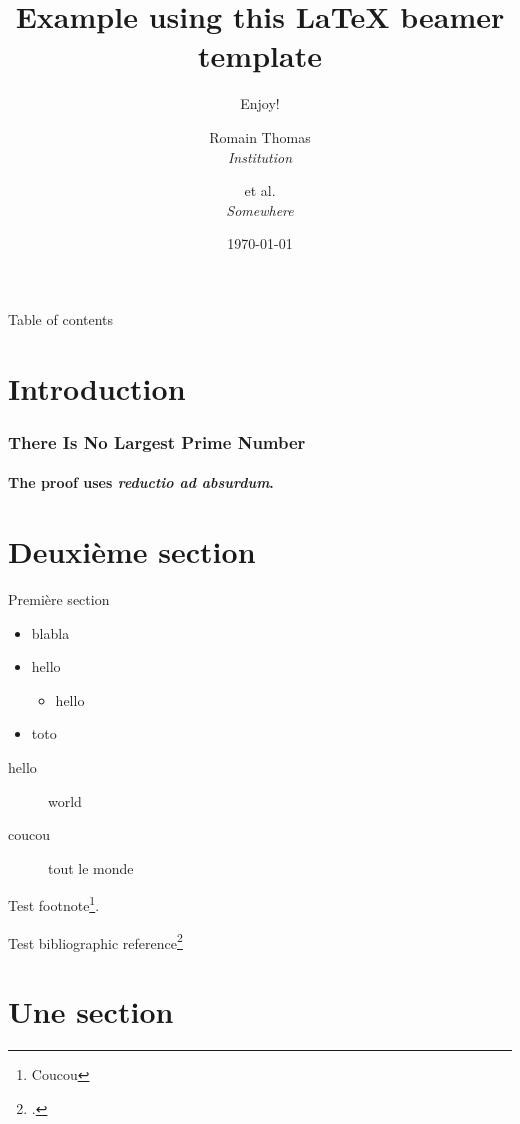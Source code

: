 \documentclass[aspectratio=169]{my-beamer}
\title{Example using this {\LaTeX} beamer template}
\subtitle{Enjoy!}
\author{
Romain Thomas \\
\textit{Institution}
\and
et al. \\
\textit{Somewhere }
}
\date{\today}
\begin{document}
\begin{frame}[plain]
\maketitle
\end{frame}

\begin{frame}{Table of contents}
\tableofcontents
\end{frame}

\section{Introduction}

\begin{frame}
\frametitle{There Is No Largest Prime Number} 
\framesubtitle{The proof uses \textit{reductio ad absurdum}.} 
\lipsum[1]

\end{frame}


\section{Deuxième section}

\begin{frame}{Première section}
\begin{itemize}
\item blabla
\item hello \begin{itemize}
  \item hello
\end{itemize}
\item toto
\end{itemize}
\end{frame}


\begin{frame}
\begin{description}
  \item[hello] world
  \item[coucou] tout le monde
\end{description}

\bigskip
Test footnote\footnote[frame]{Coucou}.

\medskip
Test bibliographic reference\footcite{github_openalex_analysis}

\end{frame}


\section{Une section}
\end{document}

